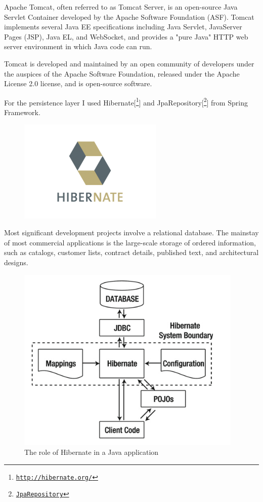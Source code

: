 Apache Tomcat, often referred to as Tomcat Server, is an open-source Java Servlet Container developed by the Apache Software Foundation (ASF). Tomcat implements several Java EE specifications including Java Servlet, JavaServer Pages (JSP), Java EL, and WebSocket, and provides a "pure Java" HTTP web server environment in which Java code can run.
\newline

Tomcat is developed and maintained by an open community of developers under the auspices of the Apache Software Foundation, released under the Apache License 2.0 license, and is open-source software.
\newline

For the persistence layer I used Hibernate[\footnote{\href{http://hibernate.org/}{\texttt{http://hibernate.org/}}}] and JpaRepository[\footnote{\href{http://docs.spring.io/spring-data/jpa/docs/current/api/org/springframework/data/jpa/repository/JpaRepository.html}{\texttt{JpaRepository}}}] from Spring Framework.
\newline
\begin{figure}[h]
	\centering
	\includegraphics[width=.5\linewidth]{images/Hibernate}
	\label{fig:hibernate-logo}
\end{figure}
Most significant development projects involve a relational database. The mainstay of most commercial applications is the large-scale storage of ordered information, such as catalogs, customer lists, contract details, published text, and architectural designs.  
\newline
\begin{figure}[h]
	\centering
	\includegraphics[width=.5\linewidth]{images/hibernateinjava}
	\caption{The role of Hibernate in a Java  application}
	\label{fig:roleofhibernate}
\end{figure}

